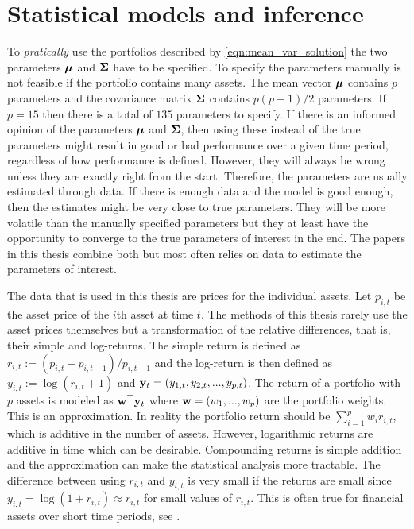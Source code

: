 \documentclass[12pt, oneside]{book}\usepackage{knitr}
\begin{document}
\chapter{Statistical models and inference}\label{ch:estim}


To \textit{pratically} use the portfolios described by \eqref{eqn:mean_var_solution} the two parameters $\mbox{\boldmath$\mu$}$ and $\mathbf{\Sigma}$ have to be specified. 
To specify the parameters manually is not feasible if the portfolio contains many assets.
The mean vector $\mbox{\boldmath$\mu$}$ contains $p$ parameters and the covariance matrix $\mathbf{\Sigma}$ contains $p(p+1)/2$ parameters.
If $p=15$ then there is a total of $135$ parameters to specify. 
If there is an informed opinion of the parameters $\mbox{\boldmath$\mu$}$ and $\mathbf{\Sigma}$, then using these instead of the true parameters might result in good or bad performance over a given time period, regardless of how performance is defined.
However, they will always be wrong unless they are exactly right from the start.
Therefore, the parameters are usually estimated through data.
If there is enough data and the model is good enough, then the estimates might be very close to true parameters.
They will be more volatile than the manually specified parameters but they at least have the opportunity to converge to the true parameters of interest in the end.
The papers in this thesis combine both but most often relies on data to estimate the parameters of interest.

The data that is used in this thesis are prices for the individual assets.
Let $p_{i,t}$ be the asset price of the $i$th asset at time $t$. 
The methods of this thesis rarely use the asset prices themselves but a transformation of the relative differences, that is, their simple and log-returns. 
The simple return is defined as $r_{i,t} := (p_{i,t}-p_{i,t-1})/p_{i,t-1}$ and the log-return is then defined as $y_{i,t} := \log(r_{i,t} + 1)$ and $\mathbf{y}_t=(y_{1,t},y_{2,t},..., y_{p,t})$.
The return of a portfolio with $p$ assets is modeled as $\mathbf{w}^\top \mathbf{y}_t$ where $\mathbf{w}=(w_1, ..., w_p)$ are the portfolio weights.
This is an approximation.
In reality the portfolio return should be $\sum_{i=1}^p w_i r_{i,t}$, which is additive in the number of assets.
However, logarithmic returns are additive in time which can be desirable. 
Compounding returns is simple addition and the approximation can make the statistical analysis more tractable. 
The difference between using $r_{i,t}$ and $y_{i,t}$ is very small if the returns are small since $y_{i,t}=\log(1+r_{i,t}) \approx r_{i,t}$ for small values of $r_{i,t}$.
This is often true for financial assets over short time periods, see \citet[p. 5]{tsay2005analysis}. 
\end{document}

